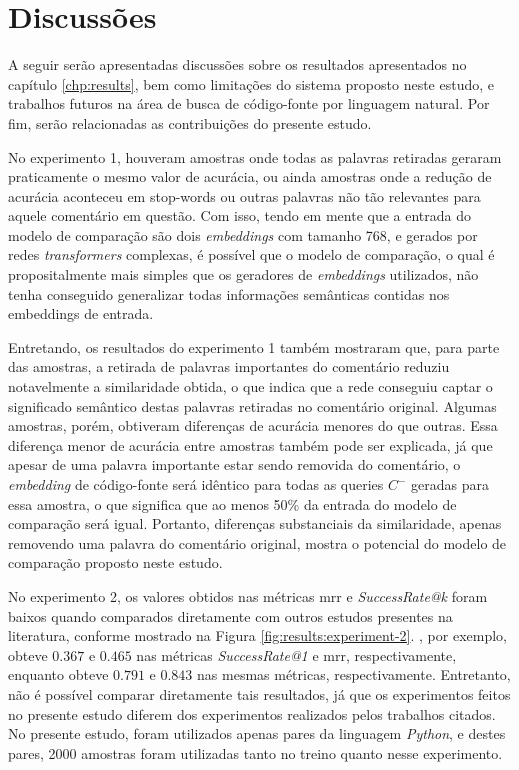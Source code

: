 \chapter{Discussões}
\label{chp:discussions}

A seguir serão apresentadas discussões sobre os resultados apresentados no capítulo \ref{chp:results}, bem como limitações do sistema proposto neste estudo, e trabalhos futuros na área de busca de código-fonte por linguagem natural. Por fim, serão relacionadas as contribuições do presente estudo.

No experimento 1, houveram amostras onde todas as palavras retiradas geraram praticamente o mesmo valor de acurácia, ou ainda amostras onde a redução de acurácia aconteceu em stop-words ou outras palavras não tão relevantes para aquele comentário em questão. Com isso, tendo em mente que a entrada do modelo de comparação são dois \textit{embeddings} com tamanho 768, e gerados por redes \textit{transformers} complexas, é possível que o modelo de comparação, o qual é propositalmente mais simples que os geradores de \textit{embeddings} utilizados, não tenha conseguido generalizar todas informações semânticas contidas nos embeddings de entrada.

Entretando, os resultados do experimento 1 também mostraram que, para parte das amostras, a retirada de palavras importantes do comentário reduziu notavelmente a similaridade obtida, o que indica que a rede conseguiu captar o significado semântico destas palavras retiradas no comentário original. Algumas amostras, porém, obtiveram diferenças de acurácia menores do que outras. Essa diferença menor de acurácia entre amostras também pode ser explicada, já que apesar de uma palavra importante estar sendo removida do comentário, o \textit{embedding} de código-fonte será idêntico para todas as queries $C^-$ geradas para essa amostra, o que significa que ao menos 50\% da entrada do modelo de comparação será igual. Portanto, diferenças substanciais da similaridade, apenas removendo uma palavra do comentário original, mostra o potencial do modelo de comparação proposto neste estudo.

No experimento 2, os valores obtidos nas métricas \gls{mrr} e \textit{SuccessRate@k} foram baixos quando comparados diretamente com outros estudos presentes na literatura, conforme mostrado na Figura \ref{fig:results:experiment-2}. \textcite{Gu2018DeepCS}, por exemplo, obteve $0.367$ e $0.465$ nas métricas \textit{SuccessRate@1} e \gls{mrr}, respectivamente, enquanto \textcite{Gu2021CRaDLeDC} obteve $0.791$ e $0.843$ nas mesmas métricas, respectivamente. Entretanto, não é possível comparar diretamente tais resultados, já que os experimentos feitos no presente estudo diferem dos experimentos realizados pelos trabalhos citados. No presente estudo, foram utilizados apenas pares da linguagem \textit{Python}, e destes pares, 2000 amostras foram utilizadas tanto no treino quanto nesse experimento.

